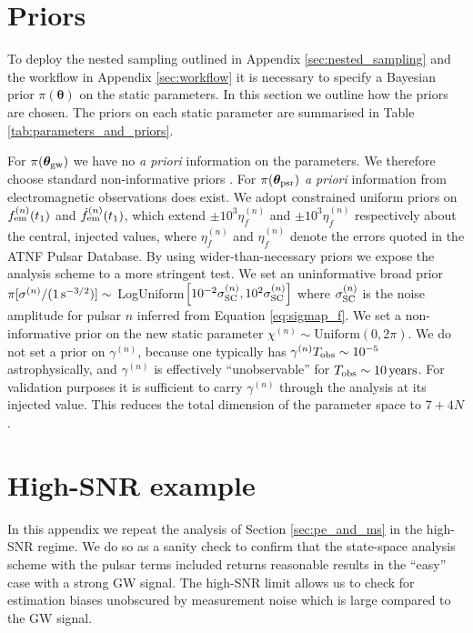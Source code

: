 \documentclass[fleqn,usenatbib,useAMS]{mnras}
\begin{document}
\section{Priors}\label{sec:set_priors}
To deploy the nested sampling outlined in Appendix \ref{sec:nested_sampling} and the workflow in Appendix \ref{sec:workflow} it is necessary to specify a Bayesian prior $\pi(\boldsymbol{\theta})$ on the static parameters. In this section we outline how the priors are chosen. The priors on each static parameter are summarised in Table \ref{tab:parameters_and_priors}.  \newline 

For $\pi(\boldsymbol{\theta}_{\rm gw})$ we have no \textit{a priori} information on the parameters. We therefore choose standard non-informative priors \citep[e.g.][]{Bhagwat2021}. For $\pi(\boldsymbol{\theta}_{\rm psr})$ \textit{a priori} information from electromagnetic observations does exist. We adopt constrained uniform priors on $f_{\rm em}^{(n)}(t_1)$ and $\dot{f}_{\rm em}^{(n)}(t_1)$, which extend $\pm 10^3 \eta_f^{(n)}$ and $\pm 10^3 \eta_{\dot{f}}^{(n)}$ respectively about the central, injected values, where $\eta_f^{(n)}$ and $\eta_{\dot{f}}^{(n)}$ denote the errors quoted in the ATNF Pulsar Database. By using wider-than-necessary priors we expose the analysis scheme to a more stringent test. We set an uninformative broad prior $\pi[\sigma^{(n)} / (1 \, {\rm s^{-3/2}})] \sim$ LogUniform$ \left [10^{-2} \sigma_{\rm SC}^{(n)}, 10^2 \sigma_{\rm SC}^{(n)} \right ]$
where $\sigma_{\rm SC}^{(n)}$ is the noise amplitude for pulsar $n$ inferred from
Equation \eqref{eq:sigmap_f}. We set a non-informative prior on the new static parameter $\chi^{(n)} \sim \text{Uniform}\left(0,2\pi\right)$. We do not set a prior on $\gamma^{(n)}$, because one typically has $\gamma^{(n)} T_{\rm obs} \sim 10^{-5}$ astrophysically, and $\gamma^{(n)}$ is effectively ``unobservable'' for $T_{\rm obs} \sim 10 \, {\rm years}$. For validation purposes it is sufficient to carry $\gamma^{(n)}$ through the analysis at its injected value. This reduces the total dimension of the parameter space to $7 + 4N$. \newline 




\section{High-SNR example} \label{sec:app_high_SNR}
In this appendix we repeat the analysis of Section \ref{sec:pe_and_ms} in the high-SNR regime. We do so as a sanity check to confirm that the state-space analysis scheme with the pulsar terms included returns reasonable results in the ``easy'' case with a strong GW signal. The high-SNR limit allows us to check for estimation biases unobscured by measurement noise which is large compared to the GW signal. \newline 
\end{document}
